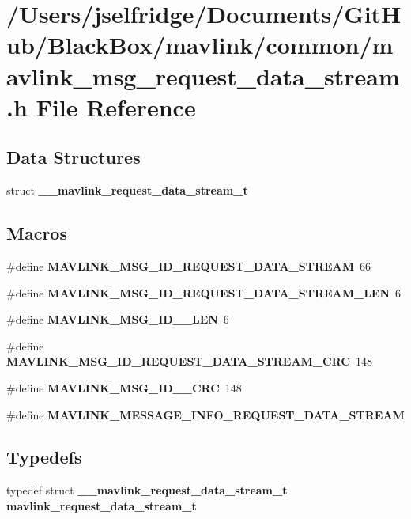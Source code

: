 \section{/\+Users/jselfridge/\+Documents/\+Git\+Hub/\+Black\+Box/mavlink/common/mavlink\+\_\+msg\+\_\+request\+\_\+data\+\_\+stream.h File Reference}
\label{mavlink__msg__request__data__stream_8h}
\subsection*{Data Structures}
\begin{DoxyCompactItemize}
\item 
struct \textbf{ \+\_\+\+\_\+mavlink\+\_\+request\+\_\+data\+\_\+stream\+\_\+t}
\end{DoxyCompactItemize}
\subsection*{Macros}
\begin{DoxyCompactItemize}
\item 
\#define \textbf{ M\+A\+V\+L\+I\+N\+K\+\_\+\+M\+S\+G\+\_\+\+I\+D\+\_\+\+R\+E\+Q\+U\+E\+S\+T\+\_\+\+D\+A\+T\+A\+\_\+\+S\+T\+R\+E\+AM}~66
\item 
\#define \textbf{ M\+A\+V\+L\+I\+N\+K\+\_\+\+M\+S\+G\+\_\+\+I\+D\+\_\+\+R\+E\+Q\+U\+E\+S\+T\+\_\+\+D\+A\+T\+A\+\_\+\+S\+T\+R\+E\+A\+M\+\_\+\+L\+EN}~6
\item 
\#define \textbf{ M\+A\+V\+L\+I\+N\+K\+\_\+\+M\+S\+G\+\_\+\+I\+D\+\_\+\_\+\+L\+EN}~6
\item 
\#define \textbf{ M\+A\+V\+L\+I\+N\+K\+\_\+\+M\+S\+G\+\_\+\+I\+D\+\_\+\+R\+E\+Q\+U\+E\+S\+T\+\_\+\+D\+A\+T\+A\+\_\+\+S\+T\+R\+E\+A\+M\+\_\+\+C\+RC}~148
\item 
\#define \textbf{ M\+A\+V\+L\+I\+N\+K\+\_\+\+M\+S\+G\+\_\+\+I\+D\+\_\+\_\+\+C\+RC}~148
\item 
\#define \textbf{ M\+A\+V\+L\+I\+N\+K\+\_\+\+M\+E\+S\+S\+A\+G\+E\+\_\+\+I\+N\+F\+O\+\_\+\+R\+E\+Q\+U\+E\+S\+T\+\_\+\+D\+A\+T\+A\+\_\+\+S\+T\+R\+E\+AM}
\end{DoxyCompactItemize}
\subsection*{Typedefs}
\begin{DoxyCompactItemize}
\item 
typedef struct \textbf{ \+\_\+\+\_\+mavlink\+\_\+request\+\_\+data\+\_\+stream\+\_\+t} \textbf{ mavlink\+\_\+request\+\_\+data\+\_\+stream\+\_\+t}
\end{DoxyCompactItemize}


